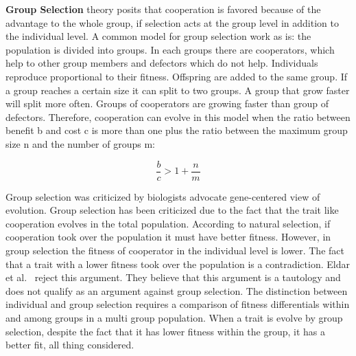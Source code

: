 \documentclass{article}
\begin{document}
\textbf{Group Selection} theory posits that cooperation is favored because of the advantage to the whole group, if selection acts at the group level in addition to the individual level. A common model for group selection work as is: the population is divided into groups. In each groups there are cooperators, which help to other group members and defectors which do not help. 
Individuals reproduce proportional to their fitness. Offspring are added to the same group.
If a group reaches a certain size it can split to two groups. A group that grow faster will split more often. Groups of cooperators are growing faster than group of defectors.
Therefore, cooperation can evolve in this model when the ratio between benefit b and cost c is more than one plus the ratio between the maximum group size n and the number of groups m:

\begin{equation} \label{eq:groupselection}
\frac{b}{c}>1+\frac{n}{m}
\end{equation}

Group selection was criticized by biologists advocate gene-centered view of evolution. Group selection has been criticized due to the fact that the trait like cooperation evolves in the total population. According to natural selection, if cooperation took over the population it must have better fitness. However, in group selection the fitness of cooperator in the individual level is lower. The fact that a trait with a lower fitness took over the population is a contradiction. Eldar et al.~\cite{eldakar2011eight} reject this argument. They believe that this argument is a tautology and does not qualify as an argument against group selection. The distinction between individual and group selection requires a comparison of fitness differentials within and among groups in a multi group population. When a trait is evolve by group selection, despite the fact that it has lower fitness within the group, it has a better fit, all thing considered. 
\end{document}
